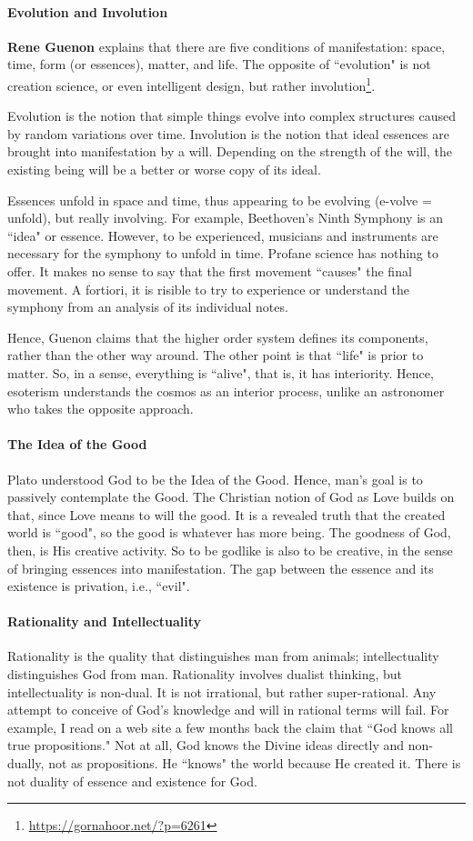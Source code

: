 \paragraph{Evolution and Involution}
\textbf{Rene Guenon} explains that there are five conditions of manifestation: space, time, form (or essences), matter, and life. The opposite of ``evolution" is not creation science, or even intelligent design, but rather involution\footnote{\url{https://gornahoor.net/?p=6261}}.

Evolution is the notion that simple things evolve into complex structures caused by random variations over time. Involution is the notion that ideal essences are brought into manifestation by a will. Depending on the strength of the will, the existing being will be a better or worse copy of its ideal.

Essences unfold in space and time, thus appearing to be evolving (e-volve = unfold), but really involving. For example, Beethoven's Ninth Symphony is an ``idea" or essence. However, to be experienced, musicians and instruments are necessary for the symphony to unfold in time. Profane science has nothing to offer. It makes no sense to say that the first movement ``causes" the final movement. A fortiori, it is risible to try to experience or understand the symphony from an analysis of its individual notes.

Hence, Guenon claims that the higher order system defines its components, rather than the other way around. The other point is that ``life" is prior to matter. So, in a sense, everything is ``alive", that is, it has interiority. Hence, esoterism understands the cosmos as an interior process, unlike an astronomer who takes the opposite approach.

\paragraph{The Idea of the Good}
Plato understood God to be the Idea of the Good. Hence, man's goal is to passively contemplate the Good. The Christian notion of God as Love builds on that, since Love means to will the good. It is a revealed truth that the created world is ``good", so the good is whatever has more being. The goodness of God, then, is His creative activity. So to be godlike is also to be creative, in the sense of bringing essences into manifestation. The gap between the essence and its existence is privation, i.e., ``evil".

\paragraph{Rationality and Intellectuality}
Rationality is the quality that distinguishes man from animals; intellectuality distinguishes God from man. Rationality involves dualist thinking, but intellectuality is non-dual. It is not irrational, but rather super-rational. Any attempt to conceive of God's knowledge and will in rational terms will fail. For example, I read on a web site a few months back the claim that ``God knows all true propositions." Not at all, God knows the Divine ideas directly and non-dually, not as propositions. He ``knows" the world because He created it. There is not duality of essence and existence for God.

